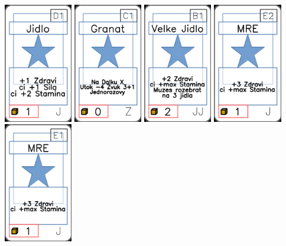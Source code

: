 \documentclass[a4paper]{article}
\begin{document}
	\includegraphics[width=3.0cm]{img-1_15}
	\includegraphics[width=3.0cm]{img-1_100}
	\includegraphics[width=3.0cm]{img-1_35}
	\includegraphics[width=3.0cm]{img-1_21}
	\includegraphics[width=3.0cm]{img-1_20}
\end{document}
